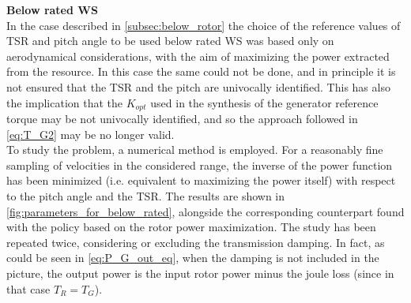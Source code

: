 \textbf{Below rated WS}\\
In the case described in \autoref{subsec:below_rotor} the choice of the reference values of TSR and pitch angle to be used below rated WS was based only on aerodynamical considerations, with the aim of maximizing the power extracted from the resource. In this case the same could not be done, and in principle it is not ensured that the TSR and the pitch are univocally identified. This has also the implication that the $K_{opt}$ used in the synthesis of the generator reference torque may be not univocally identified, and so the approach followed in \autoref{eq:T_G2} may be no longer valid. \\
To study the problem, a numerical method is employed. For a reasonably fine sampling of velocities in the considered range, the inverse of the power function has been minimized (i.e. equivalent to maximizing the power itself) with respect to the pitch angle and the TSR. The results are shown in \autoref{fig:parameters_for_below_rated}, alongside the corresponding counterpart found with the policy based on the rotor power maximization. The study has been repeated twice, considering or excluding the transmission damping. In fact, as could be seen in \autoref{eq:P_G_out_eq}, when the damping is not included in the picture, the output power is the input rotor power minus the joule loss (since in that case $T_R=T_G$).

